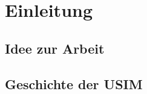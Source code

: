 \section{Einleitung}
\label{einleitung}

 \subsection{Idee zur Arbeit}
 \subsection{Geschichte der USIM}
 \label{geschichte-usim}
\clearpage